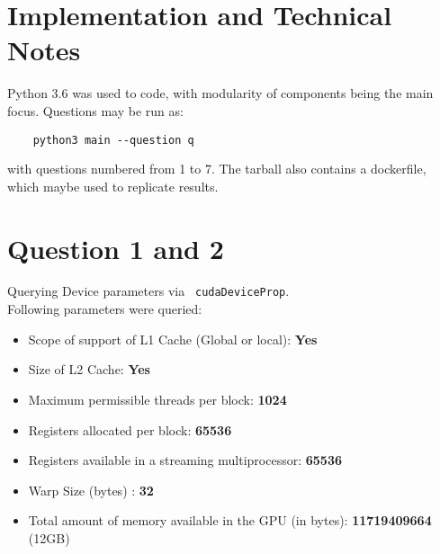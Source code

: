 \section {Implementation and Technical Notes}

Python 3.6 was used to code, with modularity of components being the main focus. Questions may be run as:

\begin{lstlisting}
    python3 main --question q
\end{lstlisting}

with questions numbered from 1 to 7. The tarball also contains a dockerfile, which maybe used to replicate results.

\section {Question 1 and 2}

Querying Device parameters via \lstinline{ cudaDeviceProp}.\\

Following parameters were queried:
\begin{itemize}
\item Scope of support of L1 Cache (Global or local): \quad \textbf{Yes}
\item Size of L2 Cache: \quad \textbf{Yes}
\item Maximum permissible threads per block: \quad \textbf{1024}
\item Registers allocated per block: \quad \textbf{65536}
\item Registers available in a streaming multiprocessor: \quad \textbf{65536}
\item Warp Size (bytes) : \quad \textbf{32}
\item Total amount of memory available in the GPU (in bytes): \quad \textbf{11719409664} (12GB)
\end{itemize}

